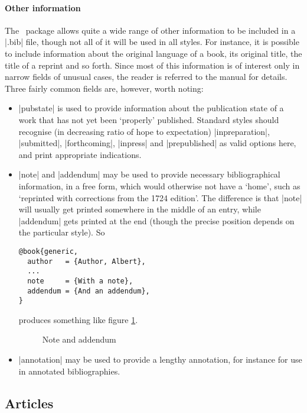 \paragraph{Other information} The \biblatex\ package allows quite a
wide range of other information to be included in a |.bib| file,
though not all of it will be used in all styles. For instance, it is
possible to include information about the original language of a book,
its original title, the title of a reprint and so forth. Since most of
this information is of interest only in narrow fields of unusual
cases, the reader is referred to the manual for details. Three fairly
common fields are, however, worth noting:
\begin{itemize}
\item |pubstate| is used to provide information about the publication
  state of a work that has not yet been `properly' published. Standard
  styles should recognise (in decreasing ratio of hope to expectation)
  |inpreparation|, |submitted|, |forthcoming|, |inpress| and
  |prepublished| as valid options here, and print appropriate
  indications.
\item |note| and |addendum| may be used to provide necessary
  bibliographical information, in a free form, which would otherwise
  not have a `home', such as `reprinted with corrections from the 1724
  edition'. The difference is that |note| will usually get printed
  somewhere in the middle of an entry, while |addendum| gets printed
  at the end (though the precise position depends on the particular
  style). So
  \begin{Verbatim}
@book{generic,
  author   = {Author, Albert},
  ...
  note     = {With a note},
  addendum = {And an addendum},
}
\end{Verbatim}
produces something like figure \ref{addendum}.

\begin{figure}
\caption{Note and addendum\label{addendum}}
\end{figure}
\item |annotation| may be used to provide a lengthy annotation, for
  instance for use in annotated bibliographies.
\end{itemize}

\subsection{Articles}

